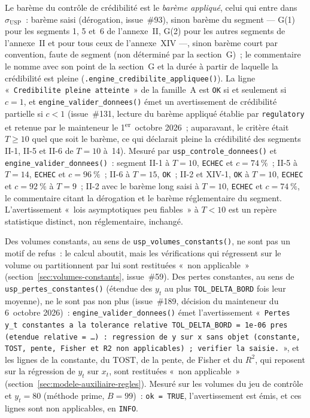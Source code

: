 \documentclass[a4paper,11pt]{article}
\newcommand{\code}[1]{\texttt{\small #1}}
\begin{document}
Le barème du contrôle de crédibilité est le \emph{barème appliqué}, celui qui entre dans
$\sigma_{\mathrm{USP}}$~: barème saisi (dérogation, issue~\#93), sinon barème du segment ---
G(1) pour les segments 1, 5 et~6 de l'annexe~II, G(2) pour les autres segments de l'annexe~II
et pour tous ceux de l'annexe~XIV ---, sinon barème court par convention, faute de segment (non
déterminé par la section~G)~; le commentaire le nomme avec son point de la section~G et la durée
à partir de laquelle la crédibilité est pleine (\code{.engine\_credibilite\_appliquee()}). La
ligne «~\code{Credibilite pleine atteinte}~» de la famille~A est \code{OK} si et seulement si
$c = 1$, et \code{engine\_valider\_donnees()} émet un avertissement de crédibilité partielle si
$c < 1$ (issue~\#131, lecture du barème appliqué établie par \code{regulatory} et retenue par le
mainteneur le 1\textsuperscript{er}~octobre 2026~; auparavant, le critère était $T \ge 10$ quel
que soit le barème, ce qui déclarait pleine la crédibilité des segments II-1, II-5 et II-6 de
$T = 10$ à~14). Mesuré par \code{usp\_controle\_donnees()} et
\code{engine\_valider\_donnees()}~: segment II-1 à $T = 10$, \code{ECHEC} et $c = 74~\%$~;
II-5 à $T = 14$, \code{ECHEC} et $c = 96~\%$~; II-6 à $T = 15$, \code{OK}~; II-2 et XIV-1,
\code{OK} à $T = 10$, \code{ECHEC} et $c = 92~\%$ à $T = 9$~; II-2 avec le barème long saisi
à $T = 10$, \code{ECHEC} et $c = 74~\%$, le commentaire citant la dérogation et le barème
réglementaire du segment. L'avertissement «~lois asymptotiques peu fiables~» à $T < 10$ est un
repère statistique distinct, non réglementaire, inchangé.

Des volumes constants, au sens de \code{usp\_volumes\_constants()}, ne sont pas un motif de refus~:
le calcul aboutit, mais les vérifications qui régressent sur le volume ou partitionnent par lui
sont restituées «~non applicable~» (section~\ref{sec:volumes-constants}, issue~\#59).
Des pertes constantes, au sens de \code{usp\_pertes\_constantes()} (étendue des $y_t$ au plus
\code{TOL\_DELTA\_BORD} fois leur moyenne), ne le sont pas non plus (issue~\#189, décision du
mainteneur du 6~octobre 2026)~: \code{engine\_valider\_donnees()} émet l'avertissement
«~\code{Pertes y\_t constantes a la tolerance relative TOL\_DELTA\_BORD = 1e-06 pres (etendue
relative = \dots) : regression de y sur x sans objet (constante, TOST, pente, Fisher et R2 non
applicables) ; verifier la saisie.}~», et les lignes de la constante, du TOST, de la pente, de
Fisher et du $R^2$, qui reposent sur la régression de $y_t$ sur $x_t$, sont restituées «~non
applicable~» (section~\ref{sec:modele-auxiliaire-regles}). Mesuré sur les
volumes du jeu de contrôle et $y_t = 80$ (méthode prime, $B = 99$)~: \code{ok = TRUE},
l'avertissement est émis, et ces lignes sont non applicables, en \code{INFO}.
\end{document}
